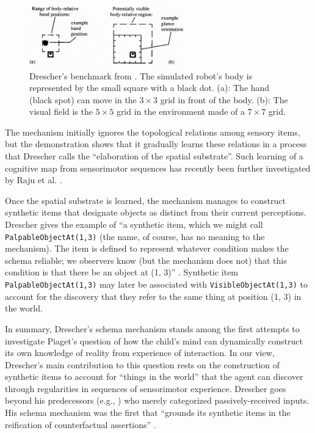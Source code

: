 \documentclass[runningheads]{llncs}
\begin{document}
\begin{figure}
	\centering
	\includegraphics[width=0.6\textwidth]{Figure_drescher_expe.png}
	\caption{Drescher's benchmark from \cite[Fig. 6.1]{drescher_made-up_1991}. The simulated robot's body is represented by the small square with a black dot. 
		(a): The hand (black spot) can move in the $3 \times 3$ grid in front of the body.
		(b): The visual field is the $5 \times 5$ grid in the environment made of a $7 \times 7$ grid.} 
	\label{fig:drescher2}
\end{figure}

The mechanism initially ignores the topological relations among sensory items, but the demonstration shows that it gradually learns these relations in a process that Drescher calls the ``elaboration of the spatial substrate''. 
Such learning of a cognitive map from sensorimotor sequences has recently been further investigated by Raju et al. \cite{raju_space_2022}.

Once the spatial substrate is learned, the mechanism manages to construct synthetic items that designate objects as distinct from their current perceptions.
Drescher gives the example of ``a synthetic item, which we might call \texttt{PalpableObjectAt(1,3)} (the name, of course, has no meaning to the mechanism). 
The item is defined to represent whatever condition makes the schema reliable; we observers know (but the mechanism does not) that this condition is that there be an object at (1, 3)'' \cite[p. 13]{drescher_made-up_1991}.
Synthetic item \texttt{PalpableObjectAt(1,3)} may later be associated with \texttt{VisibleObjectAt(1,3)} to account for the discovery that they refer to the same thing at position (1, 3) in the world.

In summary, Drescher's schema mechanism stands among the first attempts to investigate Piaget's question of how the child's mind can dynamically construct its own knowledge of reality from experience of interaction.  
In our view, Drescher's main contribution to this question rests on the construction of synthetic items to account for ``things in the world'' that the agent can discover through regularities in sequences of sensorimotor experience. 
Drescher goes beyond his predecessors (e.g., \cite{harnad_symbol_1990}) who merely categorized passively-received inputs.
His schema mechanism was the first that ``grounds its synthetic items in the reification of counterfactual assertions'' \cite[p. 90]{drescher_made-up_1991}. 
\end{document}
